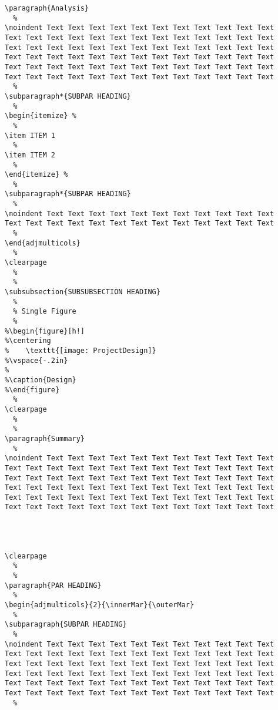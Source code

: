 \begin{verbatim}
\paragraph{Analysis}
  %
\noindent Text Text Text Text Text Text Text Text Text Text Text 
Text Text Text Text Text Text Text Text Text Text Text Text Text
Text Text Text Text Text Text Text Text Text Text Text Text Text
Text Text Text Text Text Text Text Text Text Text Text Text Text
Text Text Text Text Text Text Text Text Text Text Text Text Text
Text Text Text Text Text Text Text Text Text Text Text Text Text
  %
\subparagraph*{SUBPAR HEADING}
  %
\begin{itemize} %
  %
\item ITEM 1
  %
\item ITEM 2
  %
\end{itemize} %
  %
\subparagraph*{SUBPAR HEADING}
  %
\noindent Text Text Text Text Text Text Text Text Text Text Text 
Text Text Text Text Text Text Text Text Text Text Text Text Text
  %
\end{adjmulticols}
  %
\clearpage
  %
  %
\subsubsection{SUBSUBSECTION HEADING}
  %
  % Single Figure
  %
%\begin{figure}[h!]
%\centering
%    \texttt{[image: ProjectDesign]}
%\vspace{-.2in}
%
%\caption{Design}
%\end{figure}
  %
\clearpage
  %
  %
\paragraph{Summary}
  %
\noindent Text Text Text Text Text Text Text Text Text Text Text 
Text Text Text Text Text Text Text Text Text Text Text Text Text
Text Text Text Text Text Text Text Text Text Text Text Text Text
Text Text Text Text Text Text Text Text Text Text Text Text Text
Text Text Text Text Text Text Text Text Text Text Text Text Text
Text Text Text Text Text Text Text Text Text Text Text Text Text
  
  
  

\clearpage
  %
  %
\paragraph{PAR HEADING}
  %
\begin{adjmulticols}{2}{\innerMar}{\outerMar}
  %
\subparagraph{SUBPAR HEADING}
  %
\noindent Text Text Text Text Text Text Text Text Text Text Text 
Text Text Text Text Text Text Text Text Text Text Text Text Text
Text Text Text Text Text Text Text Text Text Text Text Text Text
Text Text Text Text Text Text Text Text Text Text Text Text Text
Text Text Text Text Text Text Text Text Text Text Text Text Text
Text Text Text Text Text Text Text Text Text Text Text Text Text
  %

\end{verbatim}

